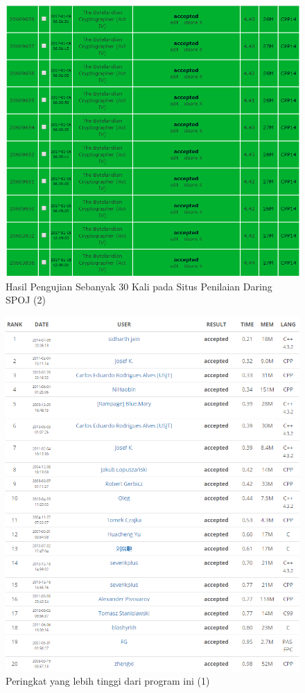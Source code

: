   \begin{figure}[H]
  \centering
  	\includegraphics[scale=0.5]{images/lampiran/uji3.png}
  	\caption{Hasil Pengujian Sebanyak 30 Kali pada Situs Penilaian Daring SPOJ (2)}
  	\label{fig:submission2}
  \end{figure}
  
  \begin{figure}[H]
  \centering
  	\includegraphics[scale=0.55]{images/lampiran/rankdiatas1.png}
  	\caption{Peringkat yang lebih tinggi dari program ini (1)}
  	\label{fig:submission2}
  \end{figure}
  
